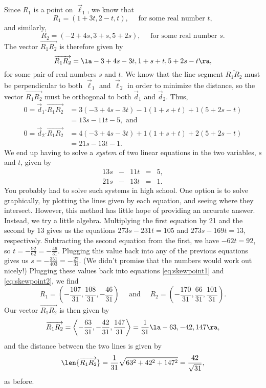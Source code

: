 {Since $R_1$ is a point on $\vec\ell_1$, we know that 
\begin{equation}\label{eq:skewpoint1}
R_1 = (1+3t, 2-t, t), \quad \text{ for some real number } t,
\end{equation}
and similarly, 
\begin{equation}\label{eq:skewpoint2}
R_2 = (-2+4s, 3+s, 5+2s), \quad \text{ for some real number } s.
\end{equation}
The vector $\overrightarrow{R_1R_2}$ is therefore given by
\[
\overrightarrow{R_1R_2}=\la -3+4s-3t, 1+s+t, 5+2s-t\ra,
\]
for some pair of real numbers $s$ and $t$. We know that the line segment $\overline{R_1R_2}$ must be perpendicular to both $\vec\ell_1$ and $\vec\ell_2$ in order to minimize the distance, so the vector $\overrightarrow{R_1R_2}$ must be orthogonal to both $\vec{d}_1$ and $\vec{d}_2$. Thus,
\begin{align*}
0 = \vec{d}_1\boldsymbol{\cdot}\overrightarrow{R_1R_2} & = 3(-3+4s-3t)-1(1+s+t)+1(5+2s-t)\\
 &=13s-11t-5, \text{ and}\\
0 = \vec{d}_2\boldsymbol{\cdot}\overrightarrow{R_1R_2} & = 4(-3+4s-3t)+1(1+s+t)+2(5+2s-t)\\
& = 21s-13t-1.
\end{align*}
We end up having to solve a \textit{system} of two linear equations in the two variables, $s$ and $t$, given by
\[
\begin{array}{ccccc}
13s&-&11t&=&5,\\
21s&-&13t&=&1.
\end{array}
\]
You probably had to solve such systems in high school. One option is to solve graphically, by plotting the lines given by each equation, and seeing where they intersect. However, this method has little hope of providing an accurate answer. Instead, we try a little algebra. Multiplying the first equation by 21 and the second by 13 gives us the equations $273s-231t=105$ and $273s-169t=13$, respectively. Subtracting the second equation from the first, we have $-62t = 92$, so $t=-\frac{92}{62}=-\frac{46}{31}$. Plugging this value back into any of the previous equations gives us $s=-\frac{351}{403}=-\frac{27}{31}$. (We didn't promise that the numbers would work out nicely!) Plugging these values back into equations \eqref{eq:skewpoint1} and \eqref{eq:skewpoint2}, we find
\[
R_1 = \left(-\frac{107}{31}, \frac{108}{31}, -\frac{46}{31}\right) \quad \text{ and } \quad R_2 = \left(-\frac{170}{31}, \frac{66}{31}, \frac{101}{31}\right).
\]
Our vector $\overrightarrow{R_1R_2}$ is then given by
\[
\overrightarrow{R_1R_2} = \left\langle -\frac{63}{31}, -\frac{42}{31}, \frac{147}{31}\right\rangle = \frac{1}{31}\la -63, -42, 147\ra,
\]
and the distance between the two lines is given by
\[
\len{\overrightarrow{R_1R_2}} = \frac{1}{31}\sqrt{63^2+42^2+147^2} = \frac{42}{\sqrt{31}},
\]
as before.
}\\

